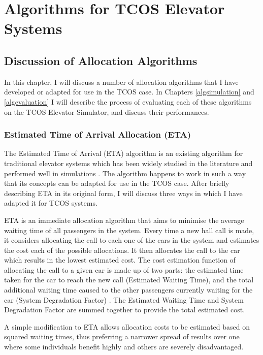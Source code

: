 \documentclass{UoYCSproject}
\begin{document}
\part{Algorithms for TCOS Elevator Systems}

\chapter{Discussion of Allocation Algorithms}
\label{algdiscussion}

In this chapter, I will discuss a number of allocation algorithms that I have developed or adapted for use in the TCOS case.  In Chapters \ref{algsimulation} and \ref{algevaluation} I will describe the process of evaluating each of these algorithms on the TCOS Elevator Simulator, and discuss their performances.

\section{Estimated Time of Arrival Allocation (ETA)}
\label{algETAdescription}

The Estimated Time of Arrival (ETA) algorithm is an existing algorithm for traditional elevator systems which has been widely studied in the literature \citep{Rong2003, Nikovski2003} and performed well in simulations \citep{Rong2003}.  The algorithm happens to work in such a way that its concepts can be adapted for use in the TCOS case.  After briefly describing ETA in its original form, I will discuss three ways in which I have adapted it for TCOS systems.

ETA is an immediate allocation algorithm that aims to minimise the average waiting time of all passengers in the system.  Every time a new hall call is made, it considers allocating the call to each one of the cars in the system and estimates the cost each of the possible allocations.  It then allocates the call to the car which results in the lowest estimated cost.  The cost estimation function of allocating the call to a given car is made up of two parts: the estimated time taken for the car to reach the new call (Estimated Waiting Time), and the total additional waiting time caused to the other passengers currently waiting for the car (System Degradation Factor) \citep{Rong2003}.  The Estimated Waiting Time and System Degradation Factor are summed together to provide the total estimated cost.

A simple modification to ETA allows allocation costs to be estimated based on squared waiting times, thus preferring a narrower spread of results over one where some individuals benefit highly and others are severely disadvantaged.
\end{document}
